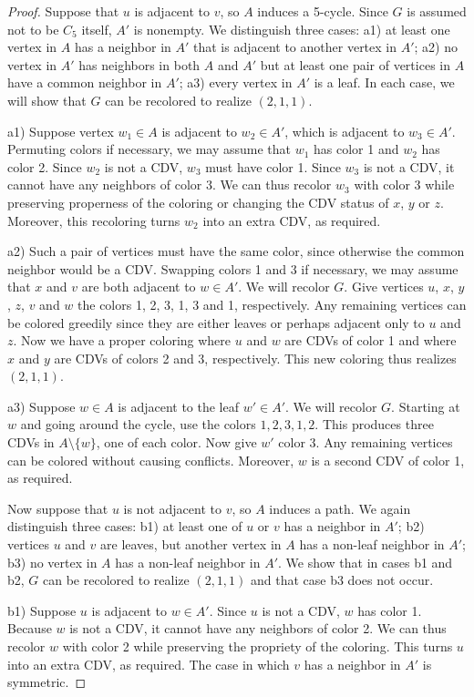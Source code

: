 \documentclass{article}
\theoremstyle{definition}
\begin{document}
\begin{proof}
Suppose that $u$ is adjacent to $v$, so $A$ induces a 5-cycle.
Since $G$ is assumed not to be $C_5$ itself, $A'$ is nonempty.
We distinguish three cases:
a1) at least one vertex in $A$ has a neighbor in $A'$ that is adjacent to another vertex in $A'$;
a2) no vertex in $A'$ has neighbors in both $A$ and $A'$ but at least one pair of vertices in $A$ have a common neighbor in $A'$;
a3) every vertex in $A'$ is a leaf.
In each case, we will show that $G$ can be recolored to realize $(2,1,1)$.

a1)
Suppose vertex $w_1\in A$ is adjacent to $w_2\in A'$, which is adjacent to $w_3\in A'$.
Permuting colors if necessary, we may assume that $w_1$ has color 1 and $w_2$ has color 2.
Since $w_2$ is not a CDV, $w_3$ must have color 1.
Since $w_3$ is not a CDV, it cannot have any neighbors of color 3.
We can thus recolor $w_3$ with color 3 while preserving properness of the coloring or changing the CDV status of $x$, $y$ or $z$.
Moreover, this recoloring turns $w_2$ into an extra CDV, as required.

a2)
Such a pair of vertices must have the same color, since otherwise the common neighbor would be a CDV.
Swapping colors 1 and 3 if necessary, we may assume that $x$ and $v$ are both adjacent to $w\in A'$.
We will recolor $G$.
Give vertices $u$, $x$, $y$, $z$, $v$ and $w$ the colors 1, 2, 3, 1, 3 and 1, respectively.
Any remaining vertices can be colored greedily since they are either leaves or perhaps adjacent only to $u$ and $z$.
Now we have a proper coloring where $u$ and $w$ are CDVs of color 1 and where $x$ and $y$ are CDVs of colors 2 and 3, respectively.
This new coloring thus realizes $(2,1,1)$.

a3)
Suppose $w\in A$ is adjacent to the leaf $w'\in A'$.
We will recolor $G$.
Starting at $w$ and going around the cycle, use the colors $1,2,3,1,2$.
This produces three CDVs in $A\setminus\{w\}$, one of each color.
Now give $w'$ color 3.
Any remaining vertices can be colored without causing conflicts.
Moreover, $w$ is a second CDV of color 1, as required.

Now suppose that $u$ is not adjacent to $v$, so $A$ induces a path.
We again distinguish three cases:
b1) at least one of $u$ or $v$ has a neighbor in $A'$;
b2) vertices $u$ and $v$ are leaves, but another vertex in $A$ has a non-leaf neighbor in $A'$;
b3) no vertex in $A$ has a non-leaf neighbor in $A'$.
We show that in cases b1 and b2, $G$ can be recolored to realize $(2,1,1)$ and that case b3 does not occur.

b1)
Suppose $u$ is adjacent to $w\in A'$.
Since $u$ is not a CDV, $w$ has color 1.
Because $w$ is not a CDV, it cannot have any neighbors of color 2.
We can thus recolor $w$ with color 2 while preserving the propriety of the coloring.
This turns $u$ into an extra CDV, as required.
The case in which $v$ has a neighbor in $A'$ is symmetric.


\end{proof}
\end{document}
